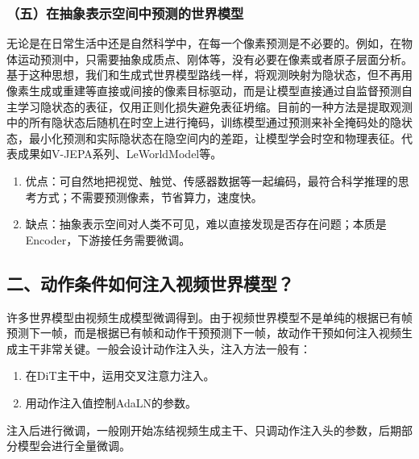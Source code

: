 \hypertarget{ux4e94ux5728ux62bdux8c61ux8868ux793aux7a7aux95f4ux4e2dux9884ux6d4bux7684ux4e16ux754cux6a21ux578b}{%
\subsubsection{（五）在抽象表示空间中预测的世界模型}\label{ux4e94ux5728ux62bdux8c61ux8868ux793aux7a7aux95f4ux4e2dux9884ux6d4bux7684ux4e16ux754cux6a21ux578b}}

无论是在日常生活中还是自然科学中，在每一个像素预测是不必要的。例如，在物体运动预测中，只需要抽象成质点、刚体等，没有必要在像素或者原子层面分析。基于这种思想，我们和生成式世界模型路线一样，将观测映射为隐状态，但不再用像素生成或重建等直接或间接的像素目标驱动，而是让模型直接通过自监督预测自主学习隐状态的表征，仅用正则化损失避免表征坍缩。目前的一种方法是提取观测中的所有隐状态后随机在时空上进行掩码，训练模型通过预测来补全掩码处的隐状态，最小化预测和实际隐状态在隐空间内的差距，让模型学会时空和物理表征。代表成果如V-JEPA系列、LeWorldModel等。

\begin{enumerate}
\def\labelenumi{\arabic{enumi}.}
\item
  优点：可自然地把视觉、触觉、传感器数据等一起编码，最符合科学推理的思考方式；不需要预测像素，节省算力，速度快。
\item
  缺点：抽象表示空间对人类不可见，难以直接发现是否存在问题；本质是Encoder，下游接任务需要微调。
\end{enumerate}

\hypertarget{ux4e8cux52a8ux4f5cux6761ux4ef6ux5982ux4f55ux6ce8ux5165ux89c6ux9891ux4e16ux754cux6a21ux578b}{%
\subsection{二、动作条件如何注入视频世界模型？}\label{ux4e8cux52a8ux4f5cux6761ux4ef6ux5982ux4f55ux6ce8ux5165ux89c6ux9891ux4e16ux754cux6a21ux578b}}

许多世界模型由视频生成模型微调得到。由于视频世界模型不是单纯的根据已有帧预测下一帧，而是根据已有帧和动作干预预测下一帧，故动作干预如何注入视频生成主干非常关键。一般会设计动作注入头，注入方法一般有：

\begin{enumerate}
\def\labelenumi{\arabic{enumi}.}
\item
  在DiT主干中，运用交叉注意力注入。
\item
  用动作注入值控制AdaLN的参数。
\end{enumerate}

注入后进行微调，一般刚开始冻结视频生成主干、只调动作注入头的参数，后期部分模型会进行全量微调。

